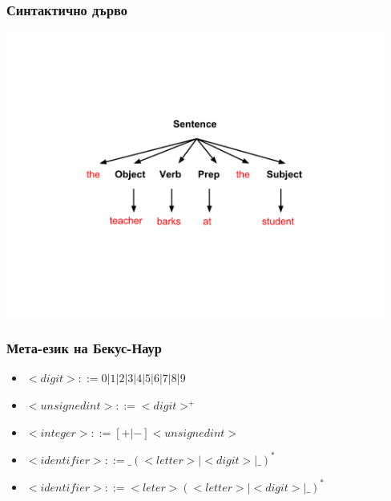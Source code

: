 \documentclass{beamer}
\begin{document}
\begin{frame}[fragile]
\frametitle{Синтактично дърво}

\begin{center}
\vspace*{-40pt}
\includegraphics[width=12.5cm]{images/stree}
\end{center}



\end{frame}

\begin{frame}[fragile]
\frametitle{Мета-език на Бекус-Наур}

\begin{itemize}
\item $<digit> ::= 0 | 1 | 2 | 3 | 4 | 5 | 6 | 7 | 8 | 9 $
\item $<unsigned int> ::= <digit>^+$
\item $<integer> ::= [+|-] <unsigned int>$
\item $<identifier> ::= \_ (<letter> | <digit> | \_ )^* $
\item $<identifier> ::= <leter> (<letter> | <digit> | \_ )^* $
\end{itemize}

\end{frame}
\end{document}

